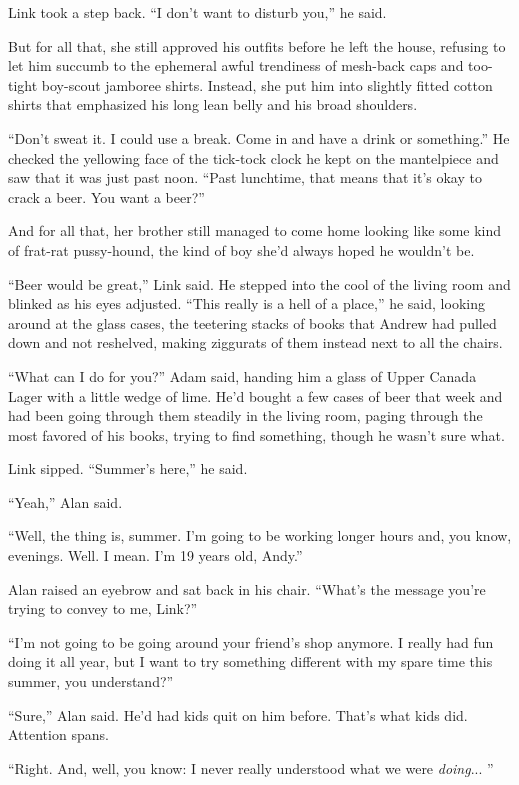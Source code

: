 Link took a step back.  ``I don't want to disturb you,'' he said.

But for all that, she still approved his outfits before he left the
house, refusing to let him succumb to the ephemeral awful trendiness
of mesh-back caps and too-tight boy-scout jamboree shirts.  Instead,
she put him into slightly fitted cotton shirts that emphasized his
long lean belly and his broad shoulders.

``Don't sweat it.  I could use a break.  Come in and have a drink or
something.'' He checked the yellowing face of the tick-tock clock he
kept on the mantelpiece and saw that it was just past noon.  ``Past
lunchtime, that means that it's okay to crack a beer.  You want a
beer?''

And for all that, her brother still managed to come home looking like
some kind of frat-rat pussy-hound, the kind of boy she'd always hoped
he wouldn't be.

``Beer would be great,'' Link said.  He stepped into the cool of the
living room and blinked as his eyes adjusted.  ``This really is a hell
of a place,'' he said, looking around at the glass cases, the
teetering stacks of books that Andrew had pulled down and not
reshelved, making ziggurats of them instead next to all the chairs.

``What can I do for you?'' Adam said, handing him a glass of Upper
Canada Lager with a little wedge of lime.  He'd bought a few cases of
beer that week and had been going through them steadily in the living
room, paging through the most favored of his books, trying to find
something, though he wasn't sure what.

Link sipped.  ``Summer's here,'' he said.

``Yeah,'' Alan said.

``Well, the thing is, summer.  I'm going to be working longer hours
and, you know, evenings.  Well.  I mean.  I'm 19 years old, Andy.''

Alan raised an eyebrow and sat back in his chair.  ``What's the
message you're trying to convey to me, Link?''

``I'm not going to be going around your friend's shop anymore.  I
really had fun doing it all year, but I want to try something
different with my spare time this summer, you understand?''

``Sure,'' Alan said.  He'd had kids quit on him before.  That's what
kids did.  Attention spans.

``Right.  And, well, you know:  I never really understood what we were
\textit{doing}...  ''

